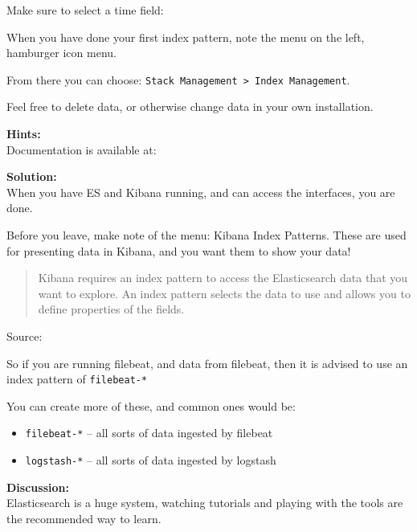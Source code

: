 \documentclass[a4paper,11pt,notitlepage]{report}
\begin{document}

Make sure to select a time field:


When you have done your first index pattern, note the menu on the left, hamburger icon menu.

From there you can choose: \verb+Stack Management > Index Management+.


Feel free to delete data, or otherwise change data in your own installation.



{\bf Hints:}\\
Documentation is available at:\\

{\bf Solution:}\\
When you have ES and Kibana running, and can access the interfaces, you are done.

Before you leave, make note of the menu: Kibana Index Patterns. These are used for presenting data in Kibana, and you want them to show your data!

\begin{quote}
Kibana requires an index pattern to access the Elasticsearch data that you want to explore. An index pattern selects the data to use and allows you to define properties of the fields.
\end{quote}
Source: 

So if you are running filebeat, and data from filebeat, then it is advised to use an index pattern of \verb+filebeat-*+


You can create more of these, and common ones would be:
\begin{itemize}
\item \verb+filebeat-*+ -- all sorts of data ingested by filebeat
\item \verb+logstash-*+ -- all sorts of data ingested by logstash

\end{itemize}

{\bf Discussion:}\\
Elasticsearch is a huge system, watching tutorials and playing with the tools are the recommended way to learn.
\end{document}
